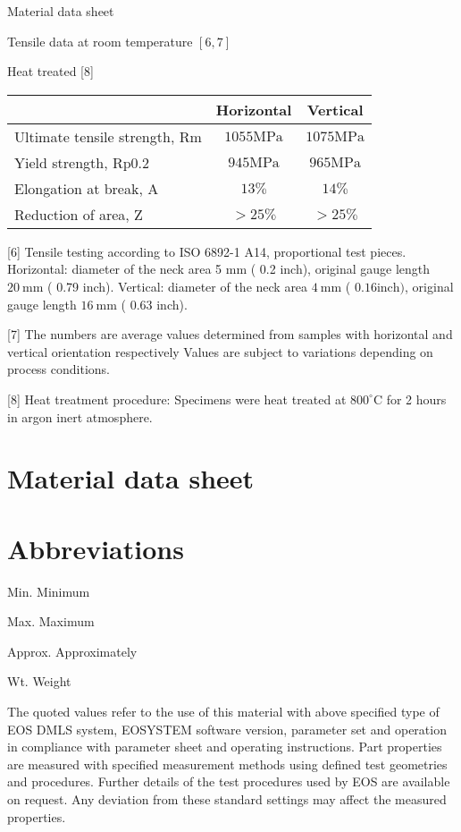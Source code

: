 \documentclass[10pt]{article}
\begin{document}
Material data sheet

Tensile data at room temperature $[6,7]$

Heat treated [8]

\begin{center}
\begin{tabular}{lcc}
\hline
 & Horizontal & Vertical \\
\hline
Ultimate tensile strength, Rm & $1055 \mathrm{MPa}$ & $1075 \mathrm{MPa}$ \\
\hline
Yield strength, Rp0.2 & $945 \mathrm{MPa}$ & $965 \mathrm{MPa}$ \\
\hline
Elongation at break, A & $13 \%$ & $14 \%$ \\
\hline
Reduction of area, Z & $>25 \%$ & $>25 \%$ \\
\hline
\end{tabular}
\end{center}

[6] Tensile testing according to ISO 6892-1 A14, proportional test pieces. Horizontal: diameter of the neck area 5 $\mathrm{mm}$ ( 0.2 inch), original gauge length $20 \mathrm{~mm}$ ( 0.79 inch). Vertical: diameter of the neck area $4 \mathrm{~mm}$ ( $0.16 \mathrm{inch})$, original gauge length $16 \mathrm{~mm}$ ( 0.63 inch).

[7] The numbers are average values determined from samples with horizontal and vertical orientation respectively Values are subject to variations depending on process conditions.

[8] Heat treatment procedure: Specimens were heat treated at $800^{\circ} \mathrm{C}$ for 2 hours in argon inert atmosphere.

\section*{Material data sheet}
\section*{Abbreviations}
Min. Minimum

Max. Maximum

Approx. Approximately

Wt. Weight

The quoted values refer to the use of this material with above specified type of EOS DMLS system, EOSYSTEM software version, parameter set and operation in compliance with parameter sheet and operating instructions. Part properties are measured with specified measurement methods using defined test geometries and procedures. Further details of the test procedures used by EOS are available on request. Any deviation from these standard settings may affect the measured properties.
\end{document}
